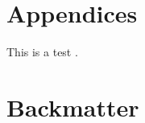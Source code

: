 \part{Appendices}
This is a test \cite{Mooers2016DirectMethodsStructureDeterminationOfATrypanosomeRNAEditingSubstrateFragmentWithTranslationalPseudosymmetry}.
%
%
% 
% 
%
% 
% 
% 
% 
% 
% 
% 
% 
%  
% 
% 
% 
% 
% 
% 
\part{Backmatter}
\backmatter %

\listofauthors
\printindex

